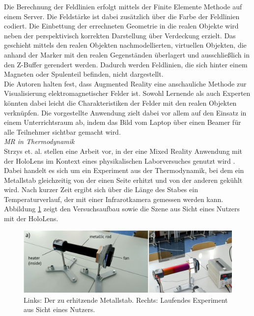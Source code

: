 Die Berechnung der Feldlinien erfolgt mittels der Finite Elemente Methode auf einem Server. Die Feldstärke ist dabei zusätzlich über die Farbe der Feldlinien codiert. Die Einbettung der errechneten Geometrie in die realen Objekte wird neben der perspektivisch korrekten Darstellung über Verdeckung erzielt. Das geschieht mittels den realen Objekten nachmodellierten, virtuellen Objekten, die anhand der Marker mit den realen Gegenständen überlagert und ausschließlich in den Z-Buffer gerendert werden. Dadurch werden Feldlinien, die sich hinter einem Magneten oder Spulenteil befinden, nicht dargestellt.\\

Die Autoren halten fest, dass Augmented Reality eine anschauliche Methode zur Visualisierung elektromagnetischer Felder ist. Sowohl Lernende als auch Experten könnten dabei leicht die Charakteristiken der Felder mit den realen Objekten verknüpfen. Die vorgestellte Anwendung zielt dabei vor allem auf den Einsatz in einem Unterrichtsraum ab, indem das Bild vom Laptop über einen Beamer für alle Teilnehmer sichtbar gemacht wird.\\

\vspace{4px}
\textit{MR in Thermodynamik}\\
Strzys et. al. stellen eine Arbeit vor, in der eine Mixed Reality Anwendung mit der HoloLens im Kontext eines physikalischen Laborversuches genutzt wird \cite{Strzys17}. Dabei handelt es sich um ein Experiment aus der Thermodynamik, bei dem ein Metallstab gleichzeitig von der einen Seite erhitzt und von der anderen gekühlt wird. Nach kurzer Zeit ergibt sich über die Länge des Stabes ein Temperaturverlauf, der mit einer Infrarotkamera gemessen werden kann. Abbildung \ref{img:Strzys17} zeigt den Versuchsaufbau sowie die Szene aus Sicht eines Nutzers mit der HoloLens.\\

\begin{figure}[h!]
	\centering
	\includegraphics[width=1\textwidth]{images/Strzys18.png}
	\caption{Links: Der zu erhitzende Metallstab. Rechts: Laufendes Experiment aus Sicht eines Nutzers. \cite{Strzys17}}
	\label{img:Strzys17}
\end{figure}

